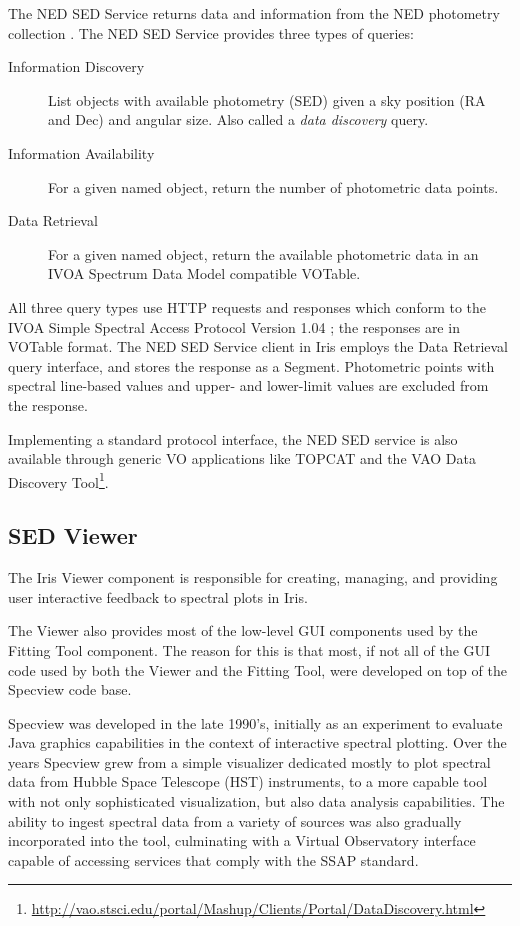 \documentclass[preprint,authoryear,5p]{elsarticle}
\begin{document}
\begin{sloppypar}
The NED SED Service returns data and information from the NED photometry
collection \citep{2007ASPC..376..153M}. The NED SED Service provides three types
of queries:
\end{sloppypar}

\begin{description}
\item[Information Discovery] List objects with
available photometry (SED) given a sky position (RA and Dec) and angular size.
Also called a \emph{data discovery} query. 
\item[Information Availability] For
a given named object, return the number of photometric data points. 
\item[Data Retrieval] For a given named object, return the
available photometric data in an IVOA Spectrum Data Model compatible VOTable.
\end{description}

All three query types use HTTP requests and responses which conform to the 
IVOA Simple Spectral Access Protocol Version 1.04 \citep[SSAP;][]{2012arXiv1203.5725T}; 
the responses are in VOTable format. The NED SED Service client in Iris
employs the Data Retrieval query interface, and stores the
response as a Segment. Photometric points with spectral line-based values and
upper- and lower-limit values are excluded from the response.

Implementing a standard protocol interface, the NED SED service is also
available through generic VO applications like TOPCAT and the VAO Data Discovery
Tool\footnote{\url{http://vao.stsci.edu/portal/Mashup/Clients/Portal/DataDiscovery.html}}.

\subsection{SED Viewer} \label{subsec:specview}
The Iris Viewer component is responsible for creating, managing, and providing
user interactive feedback to spectral plots in Iris.

The Viewer also provides most of the low-level GUI
components used by the Fitting Tool component. The reason for this is that most,
if not all of the GUI code used by both the Viewer and the Fitting Tool, were
developed on top of the Specview \citep[][ascl:1210.016]{2002ASPC..281..120B} code base.

Specview was developed in the late 1990's, initially as an experiment to evaluate
Java graphics capabilities in the context of interactive spectral plotting. Over
the years Specview grew from a simple visualizer dedicated mostly to plot
spectral data from Hubble Space Telescope (HST) instruments, to a more capable
tool with not only sophisticated visualization, but also data analysis
capabilities. The ability to ingest spectral data from a variety of sources was
also gradually incorporated into the tool, culminating with a Virtual
Observatory interface capable of accessing services that comply with the
SSAP standard.
\end{document}
